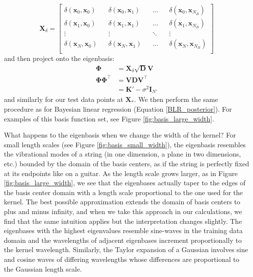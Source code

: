 \documentclass{article}
\begin{document}
\begin{equation}
    \mathbf{X}_\delta =
    \begin{bmatrix}
    \delta(\mathbf{x}_0,\mathbf{x}_0) && \delta(\mathbf{x}_0,\mathbf{x}_1) && \dots && \delta(\mathbf{x}_0,\mathbf{x}_{N_B}) \\
    \delta(\mathbf{x}_1,\mathbf{x}_0) && \delta(\mathbf{x}_1,\mathbf{x}_1) && \dots && \delta(\mathbf{x}_1,\mathbf{x}_{N_B}) \\
    \vdots && \vdots && \ddots && \vdots \\
    \delta(\mathbf{x}_{N},\mathbf{x}_0) && \delta(\mathbf{x}_{N},\mathbf{x}_1) && \dots && \delta(\mathbf{x}_{N},\mathbf{x}_{N_B}) \\
    \end{bmatrix}
\end{equation}
and then project onto the eigenbasis:
\begin{equation}
\begin{split}
    \boldsymbol{\Phi} &= \mathbf{X}_\delta \sqrt{\mathbf{D}}\mathbf{V}\\ \boldsymbol{\Phi} \boldsymbol{\Phi}^\top&=\mathbf{VDV}^\top\\&=\mathbf{K}'-\sigma^2 \mathbf{I}_{N'}
    \end{split}
\end{equation}
and similarly for our test data points at $\mathbf{X}_\ast$. We then perform the same procedure as for Bayesian linear regression (Equation \ref{BLR_posterior}). For examples of this basis function set, see Figure \ref{fig:basis_large_width}.


What happens to the eigenbasis when we change the width of the kernel? For small length scales (see Figure \ref{fig:basis_small_width}), the eigenbasis resembles the vibrational modes of a string (in one dimension, a plane in two dimensions, etc.) bounded by the domain of the basis centers, as if the string is perfectly fixed at its endpoints like on a guitar. As the length scale grows larger, as in Figure \ref{fig:basis_large_width}, we see that the eigenbases actually taper to the edges of the basis center domain with a length scale proportional to the one used for the kernel. The best possible approximation extends the domain of basis centers to plus and minus infinity, and when we take this approach in our calculations, we find that the same intuition applies but the interpretation changes slightly. The eigenbases with the highest eigenvalues resemble sine-waves in the training data domain and the wavelengths of adjacent eigenbases increment proportionally to the kernel wavelength. Similarly, the Taylor expansion of a Gaussian involves sine and cosine waves of differing wavelengths whose differences are proportional to the Gaussian length scale.
\end{document}
